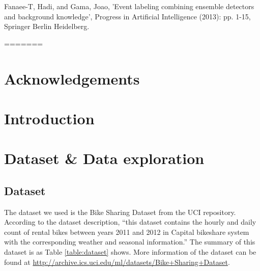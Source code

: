 \documentclass[12pt]{article}
\begin{document}
\begin{thebibliography}{9}
Fanaee-T, Hadi, and Gama, Joao, 'Event labeling combining ensemble detectors and background knowledge', Progress in Artificial Intelligence (2013): pp. 1-15, Springer Berlin Heidelberg.
\end{thebibliography}

=======
	\singlespace
	\maketitle
	
	\tableofcontents
	\newpage
	\section*{Acknowledgements}
	
	
	\begin{abstract}                %
		
		
	\end{abstract}
	
	\setcounter{secnumdepth}{4}
	
	\section{Introduction}
	\label{sec:introduction}
	
	\section{Dataset \& Data exploration}
	\subsection{Dataset}
	The dataset we used is the Bike Sharing Dataset from the UCI repository. According to the dataset description, ``this dataset contains the hourly and daily count of rental bikes between years 2011 and 2012 in Capital bikeshare system with the corresponding weather and seasonal information.''
	The summary of this dataset is as Table \ref{table:dataset} shows. More information of the dataset can be found at \url{http://archive.ics.uci.edu/ml/datasets/Bike+Sharing+Dataset}.
	
\end{document}

